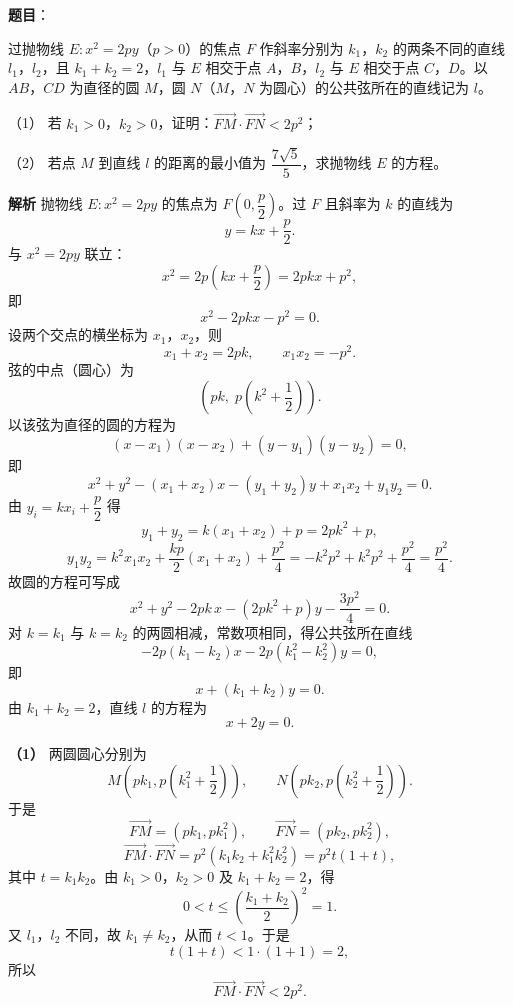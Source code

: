 \begin{answer}

\textbf{题目}：

过抛物线 $E:x^2=2py$（$p>0$）的焦点 $F$ 作斜率分别为 $k_1$，$k_2$ 的两条不同的直线 $l_1$，$l_2$，且 $k_1+k_2=2$，$l_1$ 与 $E$ 相交于点 $A$，$B$，$l_2$ 与 $E$ 相交于点 $C$，$D$。以 $AB$，$CD$ 为直径的圆 $M$，圆 $N$（$M$，$N$ 为圆心）的公共弦所在的直线记为 $l$。

（1） 若 $k_1>0$，$k_2>0$，证明：$\overrightarrow{FM}\cdot\overrightarrow{FN}<2p^2$；

（2） 若点 $M$ 到直线 $l$ 的距离的最小值为 $\dfrac{7\sqrt5}{5}$，求抛物线 $E$ 的方程。

\textbf{解析}
抛物线 $E:x^2=2py$ 的焦点为 $F\left(0,\dfrac p2\right)$。过 $F$ 且斜率为 $k$ 的直线为
\nopagebreak[4]
\[y=kx+\frac p2.\]
与 $x^2=2py$ 联立：
\nopagebreak[4]
\[x^2=2p\left(kx+\frac p2\right)=2pkx+p^2,\]
即
\nopagebreak[4]
\[x^2-2pkx-p^2=0.\]
设两个交点的横坐标为 $x_1$，$x_2$，则
\nopagebreak[4]
\[x_1+x_2=2pk,\qquad x_1x_2=-p^2.\]
弦的中点（圆心）为
\nopagebreak[4]
\[\left(pk,\;p\left(k^2+\frac12\right)\right).\]
以该弦为直径的圆的方程为
\nopagebreak[4]
\[(x-x_1)(x-x_2)+(y-y_1)(y-y_2)=0,\]
即
\nopagebreak[4]
\[x^2+y^2-(x_1+x_2)x-(y_1+y_2)y+x_1x_2+y_1y_2=0.\]
由 $y_i=kx_i+\dfrac p2$ 得
\nopagebreak[4]
\[y_1+y_2=k(x_1+x_2)+p=2pk^2+p,\]
\nopagebreak[4]
\[y_1y_2=k^2x_1x_2+\frac{kp}{2}(x_1+x_2)+\frac{p^2}{4}
=-k^2p^2+k^2p^2+\frac{p^2}{4}=\frac{p^2}{4}.\]
故圆的方程可写成
\nopagebreak[4]
\[x^2+y^2-2pk\,x-(2pk^2+p)y-\frac{3p^2}{4}=0.\]
对 $k=k_1$ 与 $k=k_2$ 的两圆相减，常数项相同，得公共弦所在直线
\nopagebreak[4]
\[-2p(k_1-k_2)x-2p(k_1^2-k_2^2)y=0,\]
即
\nopagebreak[4]
\[x+(k_1+k_2)y=0.\]
由 $k_1+k_2=2$，直线 $l$ 的方程为
\nopagebreak[4]
\[x+2y=0.\]

\textbf{（1）} 两圆圆心分别为
\nopagebreak[4]
\[M\left(pk_1,p\left(k_1^2+\frac12\right)\right),\qquad
N\left(pk_2,p\left(k_2^2+\frac12\right)\right).\]
于是
\nopagebreak[4]
\[\overrightarrow{FM}=\left(pk_1,pk_1^2\right),\qquad
\overrightarrow{FN}=\left(pk_2,pk_2^2\right),\]
\nopagebreak[4]
\[\overrightarrow{FM}\cdot\overrightarrow{FN}
=p^2\left(k_1k_2+k_1^2k_2^2\right)
=p^2t(1+t),\]
其中 $t=k_1k_2$。由 $k_1>0$，$k_2>0$ 及 $k_1+k_2=2$，得
\nopagebreak[4]
\[0<t\leqslant\left(\frac{k_1+k_2}{2}\right)^2=1.\]
又 $l_1$，$l_2$ 不同，故 $k_1\neq k_2$，从而 $t<1$。于是
\nopagebreak[4]
\[t(1+t)<1\cdot(1+1)=2,\]
所以
\nopagebreak[4]
\[\overrightarrow{FM}\cdot\overrightarrow{FN}<2p^2.\]


\end{answer}
